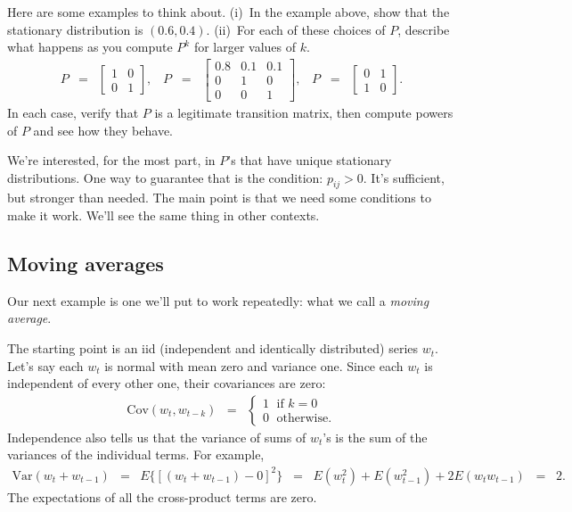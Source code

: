 \documentclass[11pt]{article}
\begin{document}
Here are some examples to think about.
(i)~In the example above, show that the stationary distribution is $ (0.6, 0.4)$.
(ii)~For each of these choices of $P$, describe what happens as you compute
$P^k$ for larger values of $k$.
\begin{eqnarray*}
    P &=& \left[
            \begin{array}{cc}
            1 & 0 \\  0 & 1
            \end{array}
            \right], \;\;\;
    P \;\;=\;\; \left[
            \begin{array}{ccc}
            0.8 & 0.1 & 0.1 \\ 0 & 1 & 0 \\ 0 & 0 & 1
            \end{array}
            \right], \;\;\;
    P \;\;=\;\; \left[
            \begin{array}{cc}
            0 & 1 \\  1 & 0
            \end{array}
            \right] .
\end{eqnarray*}
In each case, verify that $P$ is a legitimate transition matrix,
then compute powers of $P$ and see how they behave.

We're interested, for the most part, in $P$'s that have
unique stationary distributions.
One way to guarantee that is the condition:  $p_{ij} > 0$.
It's sufficient, but stronger than needed.
The main point is that we need some conditions to make it work.
We'll see the same thing in other contexts.


\subsection*{Moving averages}

Our next example is one we'll put to work repeatedly:
what we call a {\it moving average\/}.

The starting point is an iid (independent and identically distributed)
series $w_t$.
Let's say each $w_t$ is normal with mean zero and variance one.
Since each $w_t$ is independent of every other one,
their covariances are zero:
\begin{eqnarray*}
    \mbox{Cov} (w_t, w_{t-k}) &=&
            \left\{
            \begin{array}{l}
            1 \; \mbox{ if } k=0  \\
            0 \; \mbox{ otherwise}.
            \end{array}
            \right.
\end{eqnarray*}
Independence also tells us that the variance of sums of $w_t$'s
is the sum of the variances of the individual terms.
For example,
\begin{eqnarray*}
    \mbox{Var}(w_t + w_{t-1}) &=&
            E \{ [(w_t + w_{t-1}) - 0]^2 \}
            \;\;=\;\; E (w_t^2) + E (w_{t-1}^2) + 2 E (w_t w_{t-1})
            \;\;=\;\; 2 .
\end{eqnarray*}
The expectations of all the cross-product terms are zero.
\end{document}
